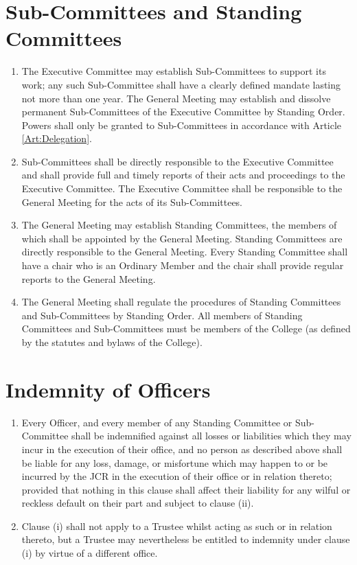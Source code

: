 \documentclass[11pt,a4paper, oneside]{memoir}
\begin{document}
	\section{Sub-Committees and Standing Committees} \label{Art:Sub-Committees}
	\begin{enumerate}
		\item The Executive Committee may establish Sub-Committees to support its work; any such Sub-Committee shall have a clearly defined mandate lasting not more than one year.
		The General Meeting may establish and dissolve permanent Sub-Committees of the Executive Committee by Standing Order.
		Powers shall only be granted to Sub-Committees in accordance with Article \ref{Art:Delegation}.
		\item Sub-Committees shall be directly responsible to the Executive Committee and shall provide full and timely reports of their acts and proceedings to the Executive Committee.
		The Executive Committee shall be responsible to the General Meeting for the acts of its Sub-Committees. 
		\item The General Meeting may establish Standing Committees, the members of which shall be appointed by the General Meeting.
		Standing Committees are directly responsible to the General Meeting.  Every Standing Committee shall have a chair who is an Ordinary Member and the chair shall provide regular reports to the General Meeting.
		\item The General Meeting shall regulate the procedures of Standing Committees and Sub-Committees by Standing Order.
		All members of Standing Committees and Sub-Committees must be members of the College (as defined by the statutes and bylaws of the College).
	\end{enumerate}
	\section{Indemnity of Officers} \label{Art:OfficerIndemnity}
	\begin{enumerate}
		\item Every Officer, and every member of any Standing Committee or Sub-Committee shall be indemnified against all losses or liabilities which they may incur in the execution of their office, and no person as described above shall be liable for any loss, damage, or misfortune which may happen to or be incurred by the JCR in the execution of their office or in relation thereto; provided that nothing in this clause shall affect their liability for any wilful or reckless default on their part and subject to clause (ii).
		\item Clause (i) shall not apply to a Trustee whilst acting as such or in relation thereto, but a Trustee may nevertheless be entitled to indemnity under clause (i) by virtue of a different office.
	\end{enumerate}
\end{document}
